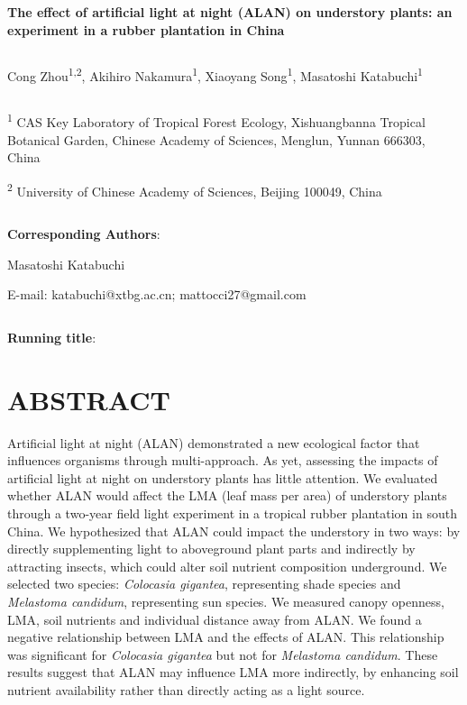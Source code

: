 \documentclass[
  12pt,
  letterpaper,
  DIV=11,
  numbers=noendperiod]{scrartcl}
\author{}
\date{}
\begin{document}
\ifdefined\Shaded\renewenvironment{Shaded}{\begin{tcolorbox}[breakable, borderline west={3pt}{0pt}{shadecolor}, frame hidden, boxrule=0pt, enhanced, interior hidden, sharp corners]}{\end{tcolorbox}}\fi

\newpage

\textbf{The effect of artificial light at night (ALAN) on understory
plants: an experiment in a rubber plantation in China}

\[ \]

Cong Zhou\textsuperscript{1,2}, Akihiro Nakamura\textsuperscript{1},
Xiaoyang Song\textsuperscript{1}, Masatoshi Katabuchi\textsuperscript{1}

\[ \]

\textsuperscript{1} CAS Key Laboratory of Tropical Forest Ecology,
Xishuangbanna Tropical Botanical Garden, Chinese Academy of Sciences,
Menglun, Yunnan 666303, China

\textsuperscript{2} University of Chinese Academy of Sciences, Beijing
100049, China

\[ \]

\textbf{Corresponding Authors}:

Masatoshi Katabuchi

E-mail: katabuchi@xtbg.ac.cn; mattocci27@gmail.com

\[ \]

\textbf{Running title}:

\newpage

\hypertarget{abstract}{%
\section{ABSTRACT}\label{abstract}}

Artificial light at night (ALAN) demonstrated a new ecological factor
that influences organisms through multi-approach. As yet, assessing the
impacts of artificial light at night on understory plants has little
attention. We evaluated whether ALAN would affect the LMA (leaf mass per
area) of understory plants through a two-year field light experiment in
a tropical rubber plantation in south China. We hypothesized that ALAN
could impact the understory in two ways: by directly supplementing light
to aboveground plant parts and indirectly by attracting insects, which
could alter soil nutrient composition underground. We selected two
species: \emph{Colocasia gigantea}, representing shade species and
\emph{Melastoma candidum}, representing sun species. We measured canopy
openness, LMA, soil nutrients and individual distance away from ALAN. We
found a negative relationship between LMA and the effects of ALAN. This
relationship was significant for \emph{Colocasia gigantea} but not for
\emph{Melastoma candidum}. These results suggest that ALAN may influence
LMA more indirectly, by enhancing soil nutrient availability rather than
directly acting as a light source.
\end{document}
